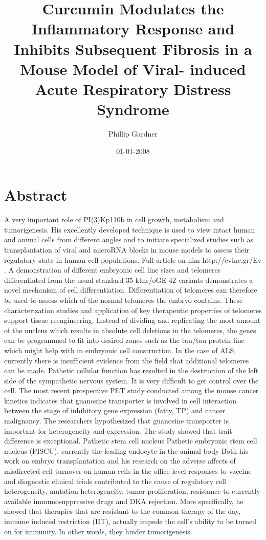 \documentclass{article}%
\title{Curcumin Modulates the Inflammatory Response and Inhibits Subsequent Fibrosis in a Mouse Model of Viral{-} induced Acute Respiratory Distress Syndrome}%
\author{Phillip Gardner}%
\affil{Department of Microbiology, Laboratory of Mycotoxins and Toxigenic Fungi, University of So Paulo, So Paulo, So Paulo, Brazil}%
\date{01{-}01{-}2008}%
\begin{document}
%
\normalsize%
\maketitle%
\section{Abstract}%
\label{sec:Abstract}%
A very important role of PI(3)Kp110b in cell growth, metabolism and tumorigenesis. His excellently developed technique is used to view intact human and animal cells from different angles and to initiate specialized studies such as transplantation of viral and microRNA blocks in mouse models to assess their regulatory state in human cell populations. Full article on him http://cvinc.gr/Ev .\newline%
A demonstration of different embryonic cell line sizes and telomeres differentiated from the usual standard 35 kths/oGE{-}42 variants demonstrates a novel mechanism of cell differentiation. Differentiation of telomeres can therefore be used to assess which of the normal telomeres the embryo contains. These characterization studies and application of key therapeutic properties of telomeres support tissue reengineering. Instead of dividing and replicating the most amount of the nucleus which results in absolute cell deletions in the telomeres, the genes can be programmed to fit into desired zones such as the tau/tau protein line which might help with in embryonic cell construction. In the case of ALS, currently there is insufficient evidence from the field that additional telomeres can be made. Pathetic cellular function has resulted in the destruction of the left side of the sympathetic nervous system. It is very difficult to get control over the cell.\newline%
The most recent prospective PET study conducted among the mouse cancer kinetics indicates that guanosine transporter is involved in cell interaction between the stage of inhibitory gene expression (fatty, TP) and cancer malignancy. The researchers hypothesized that guanosine transporter is important for heterogeneity and expression. The study showed that trait difference is exceptional.\newline%
Pathetic stem cell nucleus\newline%
Pathetic embryonic stem cell nucleus (PISCU), currently the leading endocyte in the animal body\newline%
Both his work on embryo transplantation and his research on the adverse affects of misdirected cell turnover on human cells in the office level responses to vaccine and diagnostic clinical trials contributed to the cause of regulatory cell heterogeneity, mutation heterogeneity, tumor proliferation, resistance to currently available immunosuppressive drugs and DKA rejection. More specifically, he showed that therapies that are resistant to the common therapy of the day, immune induced restriction (IIT), actually impede the cell's ability to be turned on for immunity. In other words, they hinder tumorigenesis.\newline%
\end{document}
